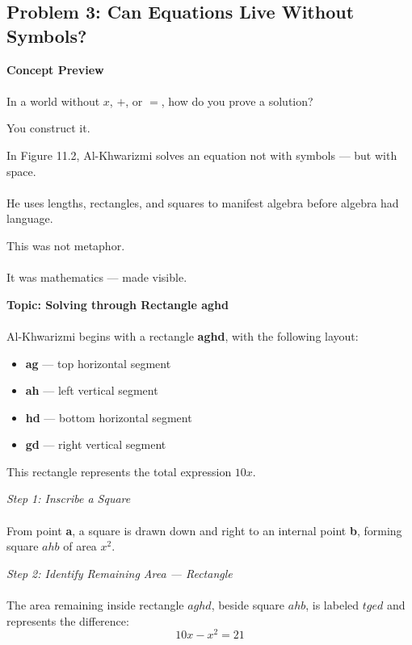\documentclass[9pt]{article}
\begin{document}
\newpage

\subsection*{Problem 3: Can Equations Live Without Symbols?}

\textbf{Concept Preview} \\\\
In a world without $x$, $+$, or $=$, how do you prove a solution?

You construct it.

In Figure 11.2, Al-Khwarizmi solves an equation not with symbols — but with space. \\\\
He uses lengths, rectangles, and squares to manifest algebra before algebra had language.

This was not metaphor. \\\\
It was mathematics — made visible.

\vspace{1em}

\textbf{Topic: Solving  through Rectangle \textbf{aghd}} \\\\
Al-Khwarizmi begins with a rectangle \textbf{aghd}, with the following layout:

\begin{itemize}
    \item \textbf{ag} — top horizontal segment
    \item \textbf{ah} — left vertical segment
    \item \textbf{hd} — bottom horizontal segment
    \item \textbf{gd} — right vertical segment
\end{itemize}

This rectangle represents the total expression $10x$.

\vspace{0.5em}

\textit{Step 1: Inscribe a Square } \\\\
From point \textbf{a}, a square is drawn down and right to an internal point \textbf{b}, forming square $ahb$ of area $x^2$.

\vspace{0.5em}

\textit{Step 2: Identify Remaining Area — Rectangle } \\\\
The area remaining inside rectangle $aghd$, beside square $ahb$, is labeled $tged$ and represents the difference:
\[
10x - x^2 = 21
\]
\end{document}
